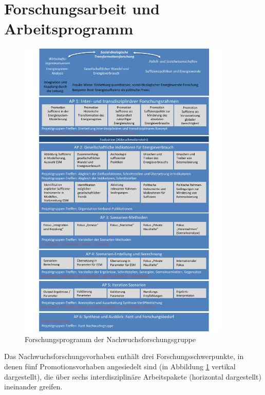 \documentclass[a4paper,11pt,twoside]{scrartcl}
\begin{document}
\section{Forschungsarbeit und Arbeitsprogramm}
\label{sec:4}
\begin{figure}[!h]
    \centering
    \includegraphics[width=0.9\textwidth]{figures/Forschungsarbeit4+Uta_2_Frauke3.pdf}
    \caption{Forschungsprogramm der Nachwuchsforschungsgruppe}
    \label{fig:forschungsprogramm}
\end{figure}

Das Nachwuchsforschungsvorhaben enthält drei Forschungsschwerpunkte, in denen fünf Promotionsvorhaben angesiedelt sind (in Abbildung \ref{fig:forschungsprogramm} vertikal dargestellt), die über sechs interdisziplinäre Arbeitspakete (horizontal dargestellt) ineinander greifen. 
\end{document}

